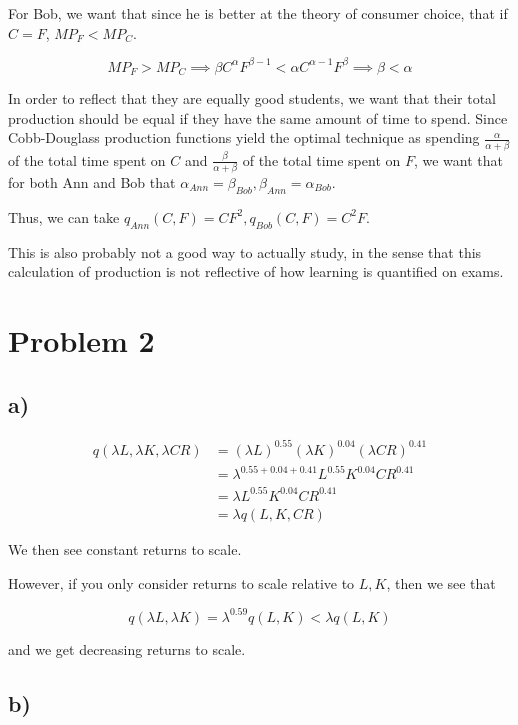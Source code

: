 \documentclass[12pt,letterpaper]{article}
\theoremstyle{definition}
\begin{document}
For Bob, we want that since he is better at the theory of consumer choice, that
if $C = F$, $MP_F < MP_C$.

\[
  MP_F > MP_C \implies \beta C^{\alpha}F^{\beta-1} < \alpha
  C^{\alpha-1}F^{\beta} \implies \beta < \alpha
\]

In order to reflect that they are equally good students, we want that their
total production should be equal if they have the same amount of time to spend.
Since Cobb-Douglass production functions yield the optimal technique as spending
$\frac{\alpha}{\alpha+\beta}$ of the total time spent on $C$ and
$\frac{\beta}{\alpha+\beta}$ of the total time spent on $F$, we want that for
both Ann and Bob that $\alpha_{Ann} = \beta_{Bob}, \beta_{Ann} = \alpha_{Bob}$.

Thus, we can take $q_{Ann}(C,F) = CF^2, q_{Bob}(C,F)=C^2F$.

This is also probably not a good way to actually study, in the sense that this
calculation of production is not reflective of how learning is quantified on exams.

\section*{Problem 2}

\subsection*{a)}

\begin{align*}
  q(\lambda L,\lambda K,\lambda CR) &= (\lambda L)^{0.55} (\lambda K)^{0.04} (\lambda CR)^{0.41} \\
            &= \lambda^{0.55+0.04+0.41}L^{0.55}K^{0.04}CR^{0.41} \\
            &= \lambda L^{0.55}K^{0.04}CR^{0.41} \\
            &= \lambda q(L,K,CR)
\end{align*}

We then see constant returns to scale.

However, if you only consider returns to scale relative to $L,K$, then we see
that

\[
  q(\lambda L,\lambda K) = \lambda^{0.59}q(L,K) < \lambda q(L,K)
\]

and we get decreasing returns to scale.

\subsection*{b)}
\end{document}
